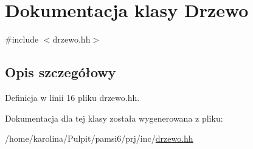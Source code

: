 \hypertarget{class_drzewo}{\section{Dokumentacja klasy Drzewo}
\label{class_drzewo}
}


{\ttfamily \#include $<$drzewo.\-hh$>$}



\subsection{Opis szczegółowy}


Definicja w linii 16 pliku drzewo.\-hh.



Dokumentacja dla tej klasy została wygenerowana z pliku\-:\begin{DoxyCompactItemize}
\item 
/home/karolina/\-Pulpit/pamsi6/prj/inc/\hyperlink{drzewo_8hh}{drzewo.\-hh}\end{DoxyCompactItemize}
